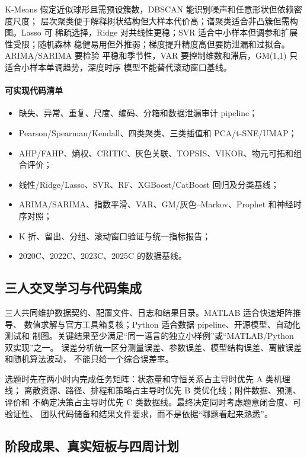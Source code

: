 \documentclass[UTF8,a4paper,12pt]{ctexart}
\begin{document}
K-Means 假定近似球形且需预设簇数，DBSCAN 能识别噪声和任意形状但依赖密度尺度；
层次聚类便于解释树状结构但大样本代价高；谱聚类适合非凸簇但需构图。Lasso 可
稀疏选择，Ridge 对共线性更稳；SVR 适合中小样本但调参和扩展性受限；随机森林
稳健易用但外推弱；梯度提升精度高但要防泄漏和过拟合。ARIMA/SARIMA 要检验
平稳和季节性，VAR 要控制维数和滞后，GM(1,1) 只适合小样本单调趋势，深度时序
模型不能替代滚动窗口基线。

\paragraph{可实现代码清单}
\begin{itemize}
  \item 缺失、异常、重复、尺度、编码、分箱和数据泄漏审计 pipeline；
  \item Pearson/Spearman/Kendall、四类聚类、三类插值和 PCA/t-SNE/UMAP；
  \item AHP/FAHP、熵权、CRITIC、灰色关联、TOPSIS、VIKOR、物元可拓和组合评价；
  \item 线性/Ridge/Lasso、SVR、RF、XGBoost/CatBoost 回归及分类基线；
  \item ARIMA/SARIMA、指数平滑、VAR、GM/灰色--Markov、Prophet 和神经时序对照；
  \item K 折、留出、分组、滚动窗口验证与统一指标报告；
  \item 2020C、2022C、2023C、2025C 的数据基线。
\end{itemize}

\subsection{三人交叉学习与代码集成}

三人共同维护数据契约、配置文件、日志和结果目录。MATLAB 适合快速矩阵推导、
数值求解与官方工具箱复核；Python 适合数据 pipeline、开源模型、自动化测试和
制图。关键结果至少满足“同一语言的独立小样例”或“MATLAB/Python 双实现”之一。
误差分析统一区分测量误差、参数误差、模型结构误差、离散误差和随机算法波动，
不能只给一个综合误差率。

选题时先在两小时内完成任务矩阵：状态量和守恒关系占主导时优先 A 类机理线；
离散资源、路径、排程和策略占主导时优先 B 类优化线；附件数据、预测、评价和
不确定决策占主导时优先 C 类数据线。最终决定同时考虑题意闭合度、可验证性、
团队代码储备和结果文件要求，而不是依据“哪题看起来熟悉”。

\subsection{阶段成果、真实短板与四周计划}
\end{document}
